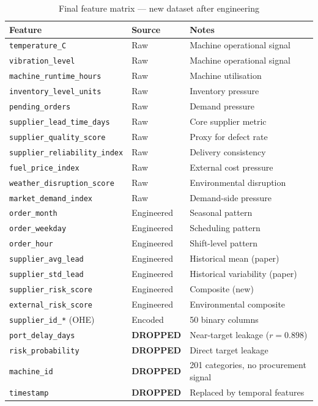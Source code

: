 \documentclass[11pt,a4paper]{article}
\begin{document}
\begin{table}[htbp]
\centering
\caption{Final feature matrix --- new dataset after engineering}
\label{tab:features}
\renewcommand{\arraystretch}{1.2}
\begin{tabularx}{\textwidth}{L{4.5cm} L{2.5cm} X}
\toprule
\textbf{Feature} & \textbf{Source} & \textbf{Notes} \\
\midrule
{}
\texttt{temperature\_C} & Raw & Machine operational signal \\
\texttt{vibration\_level} & Raw & Machine operational signal \\
\texttt{machine\_runtime\_hours} & Raw & Machine utilisation \\
\texttt{inventory\_level\_units} & Raw & Inventory pressure \\
\texttt{pending\_orders} & Raw & Demand pressure \\
\texttt{supplier\_lead\_time\_days} & Raw & Core supplier metric \\
\texttt{supplier\_quality\_score} & Raw & Proxy for defect rate \\
\texttt{supplier\_reliability\_index} & Raw & Delivery consistency \\
\texttt{fuel\_price\_index} & Raw & External cost pressure \\
\texttt{weather\_disruption\_score} & Raw & Environmental disruption \\
\texttt{market\_demand\_index} & Raw & Demand-side pressure \\
\texttt{order\_month} & Engineered & Seasonal pattern \\
\texttt{order\_weekday} & Engineered & Scheduling pattern \\
\texttt{order\_hour} & Engineered & Shift-level pattern \\
\texttt{supplier\_avg\_lead} & Engineered & Historical mean (paper) \\
\texttt{supplier\_std\_lead} & Engineered & Historical variability (paper) \\
\texttt{supplier\_risk\_score} & Engineered & Composite (new) \\
\texttt{external\_risk\_score} & Engineered & Environmental composite \\
\texttt{supplier\_id\_*} (OHE) & Encoded & 50 binary columns \\
\midrule
\texttt{port\_delay\_days} & \textcolor{red!70!black}{\textbf{DROPPED}} & Near-target leakage ($r = 0.898$) \\
\texttt{risk\_probability} & \textcolor{red!70!black}{\textbf{DROPPED}} & Direct target leakage \\
\texttt{machine\_id} & \textcolor{red!70!black}{\textbf{DROPPED}} & 201 categories, no procurement signal \\
\texttt{timestamp} & \textcolor{red!70!black}{\textbf{DROPPED}} & Replaced by temporal features \\
\bottomrule
\end{tabularx}
\end{table}
\end{document}
